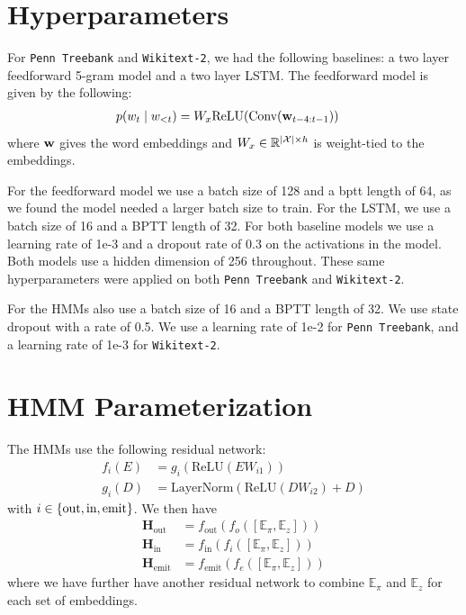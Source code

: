 \documentclass[11pt,a4paper]{article}
\begin{document}
\section{Hyperparameters}
\label{sec:hyperparams}
For \texttt{Penn Treebank} and \texttt{Wikitext-2}, we had the following baselines:
a two layer feedforward 5-gram model and a two layer LSTM.
The feedforward model is given by the following:
\begin{equation}
\begin{aligned}
p(w_t \mid w_{<t})
&= W_x\textrm{ReLU}(\textrm{Conv}(\mathbf{w}_{t-4:t-1}))
\end{aligned}
\end{equation}
where $\mathbf{w}$ gives the word embeddings and $W_x\in\mathbb{R}^{|\mathcal{X}|\times h}$ is weight-tied to the embeddings.

For the feedforward model we use a batch size of 128 and a bptt length of 64, as we found the model needed a larger batch size to train.
For the LSTM, we use a batch size of 16 and a BPTT length of 32.
For both baseline models we use a learning rate of 1e-3 and a dropout rate of 0.3 on the activations in the model.
Both models use a hidden dimension of 256 throughout.
These same hyperparameters were applied on both \texttt{Penn Treebank} and \texttt{Wikitext-2}.

For the HMMs also use a batch size of 16 and a BPTT length of 32. We use state dropout with a rate of 0.5. We use a learning rate of 1e-2 for \texttt{Penn Treebank}, and a learning rate of 1e-3 for \texttt{Wikitext-2}.

\section{HMM Parameterization}
The HMMs use the following residual network:
\begin{equation}
\label{eqn:res}
\begin{aligned}
f_i(E) &= g_i(\textrm{ReLU}(EW_{i1}))\\
g_i(D) &= \textrm{LayerNorm}(\textrm{ReLU}(DW_{i2}) + D)
\end{aligned}
\end{equation}
with $i \in \left\{\textrm{out},\textrm{in},\textrm{emit}\right\}$.
We then have
\begin{equation}
\begin{aligned}
\mathbf{H}_\textrm{out} &= f_\textrm{out}(f_o([\mathbb{E}_\pi,\mathbb{E}_z]))\\
\mathbf{H}_\textrm{in} &= f_\textrm{in}(f_i([\mathbb{E}_\pi,\mathbb{E}_z]))\\
\mathbf{H}_\textrm{emit} &= f_\textrm{emit}(f_e([\mathbb{E}_\pi,\mathbb{E}_z]))
\end{aligned}
\end{equation}
where we have further have another residual network to combine $\mathbb{E}_\pi$ and $\mathbb{E}_z$ for each set of embeddings.
\end{document}
